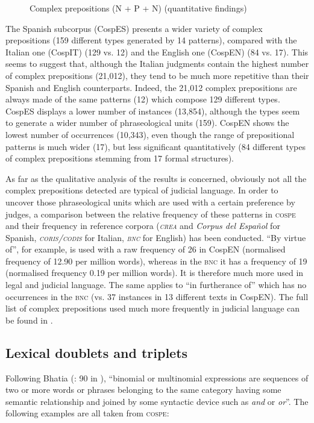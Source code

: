 \documentclass[output=paper]{LSP/langsci}
\begin{document}
\begin{figure}

\caption{Complex prepositions (N + P + N) (quantitative findings)} \label{fig:6:1}
\end{figure}

The Spanish subcorpus (CospES) presents a wider variety of complex prepositions (159 different types generated by 14 patterns), compared with the Italian one (CospIT) (129 vs. 12) and the English one (CospEN) (84 vs. 17). This seems to suggest that, although the Italian judgments contain the highest number of complex prepositions (21,012), they tend to be much more repetitive than their Spanish and English counterparts. Indeed, the 21,012 complex prepositions are always made of the same patterns (12) which compose 129 different types. CospES displays a lower number of instances (13,854), although the types seem to generate a wider number of phraseological units (159). CospEN shows the lowest number of occurrences (10,343), even though the range of prepositional patterns is much wider (17), but less significant quantitatively (84 different types of complex prepositions stemming from 17 formal structures).

As far as the qualitative analysis of the results is concerned, obviously not all the complex prepositions detected are typical of judicial language. In order to uncover those phraseological units which are used with a certain preference by judges, a comparison between the relative frequency of these patterns in \textsc{cospe} and their frequency in reference corpora (\textit{\textsc{crea}} and \textit{Corpus del Español} for Spanish, \textit{\textsc{coris}/\textsc{codis}} for Italian, \textit{\textsc{bnc}} for English) has been conducted. “By virtue of”, for example, is used with a raw frequency of 26 in CospEN (normalised frequency of 12.90 per million words), whereas in the \textsc{bnc} it has a frequency of 19 (normalised frequency 0.19 per million words). It is therefore much more used in legal and judicial language. The same applies to “in furtherance of” which has no occurrences in the \textsc{bnc} (vs. 37 instances in 13 different texts in CospEN). The full list of complex prepositions used much more frequently in judicial language can be found in \citet[200--205]{Pontrandolfo2013b}.

\subsection{Lexical doublets and triplets}
Following Bhatia (\citeyear{Bhatia1984}: 90 in \citealt[108]{Bhatia1993}), “binomial or multinomial expressions are sequences of two or more words or phrases belonging to the same category having some semantic relationship and joined by some syntactic device such as \textit{and} or \textit{or}”. The following examples are all taken from \textsc{cospe}:
\end{document}

